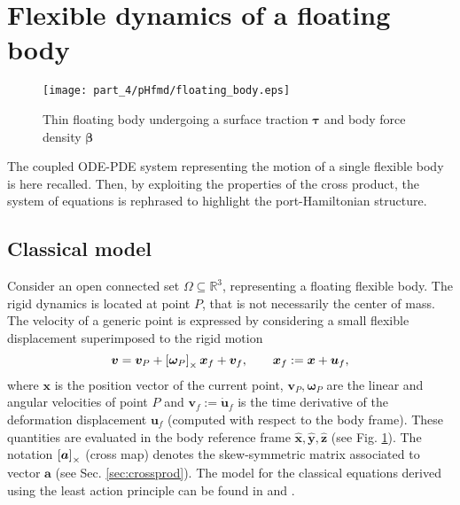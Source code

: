 \section{Flexible dynamics of a floating body}
\label{sec:class_FMD}

\begin{figure}[t]
	\centering
	\texttt{[image: part\_4/pHfmd/floating\_body.eps]} 
	\caption{Thin floating body undergoing a surface traction $\bm\tau$ and body force density $\bm\beta$}
	\label{fig:float_body}
\end{figure}
The coupled ODE-PDE system representing the motion of a single flexible body is here recalled. Then, by exploiting the properties of the cross product, the system of equations is rephrased to highlight the port-Hamiltonian structure.

\subsection{Classical model}

Consider an open connected set $\Omega \subseteq \mathbb{R}^3$, representing a floating flexible body.  The rigid dynamics is located at point $P$, that is not necessarily the center of mass. The velocity of a generic point is expressed by considering a small flexible displacement superimposed to the rigid motion
\[
\bm{v} = \bm{v}_P + \left[\bm{\omega}_P\right]_\times\bm{x}_f + \bm{v}_f,  \qquad \bm{x}_f := \bm{x}+\bm{u}_f,
\]
where $\bm{x}$ is the position vector of the current point, $\bm{v}_P, \bm{\omega}_P$ are the linear and angular velocities of point $P$  and $\bm{v}_f := \dot{\bm{u}}_f$ is the time derivative of the deformation displacement $\bm{u}_f$ (computed with respect to the body frame). These quantities are evaluated in the body reference frame $\widehat{\bm{x}}, \widehat{\bm{y}}, \widehat{\bm{z}}$ (see Fig. \ref{fig:float_body}). The notation $\left[\bm{a}\right]_\times$ (cross map) denotes the skew-symmetric matrix associated to vector $\bm{a}$ (see Sec. \ref{sec:crossprod}). The model for the classical equations derived using the least action principle can be found in \cite{simeon2006} and \cite[Chapter 4]{simeon2013computational}.


